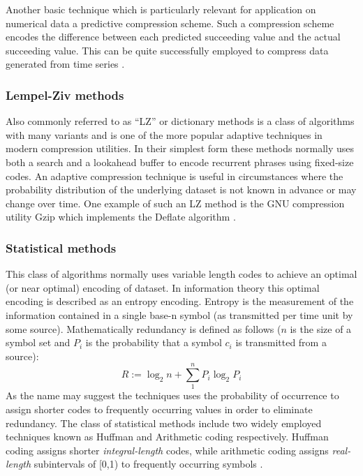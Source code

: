 \documentclass{acm_proc_article-sp}
\begin{document}
Another basic technique which is particularly relevant for application on numerical data a predictive compression scheme. Such a compression scheme encodes the 
difference between each predicted succeeding value and the actual succeeding value. This can be quite successfully employed to compress data generated from time series \cite{engelson2000lossless}.
\subsubsection{Lempel-Ziv methods}
Also commonly referred to as “LZ” or dictionary methods is a class of algorithms with many variants and is one of the more popular adaptive techniques in modern 
compression utilities. In their simplest form these methods normally uses both a search and a lookahead buffer to encode recurrent phrases using fixed-size codes. An 
adaptive compression technique is useful in circumstances where the probability distribution of the underlying dataset is not known in advance or may change over time. 
One example of such an LZ method is the GNU compression utility Gzip which implements the Deflate algorithm \cite[ch. 3]{salomon2004data}.
\subsubsection{Statistical methods}
This class of algorithms normally uses variable length codes to achieve an optimal (or near optimal) encoding of dataset. In information theory this optimal encoding is 
described as an entropy encoding. Entropy is the measurement of the information contained in a single base-n symbol (as transmitted per time unit by some source). Mathematically
redundancy is defined as follows ($n$ is the size of a symbol set and $P_{i}$ is the probability that a symbol $c_{i}$ is transmitted from a source)\cite[p. 46 - 47]{salomon2004data}:
\begin{equation}
 R := \log_2n + \sum_1^nP_i\log_2P_i
\end{equation}
As the name may suggest the techniques uses the probability of occurrence to assign shorter codes to frequently occurring values in order to eliminate redundancy. The 
class of statistical methods include two widely employed techniques known as Huffman and Arithmetic coding respectively. Huffman coding assigns shorter \textit{integral-length} codes, while arithmetic 
coding assigns \textit{real-length} subintervals of [0,1) to frequently occurring symbols \cite{Witten:1987:ACD:214762.214771}\cite[ch. 2]{salomon2004data}.
\end{document}
